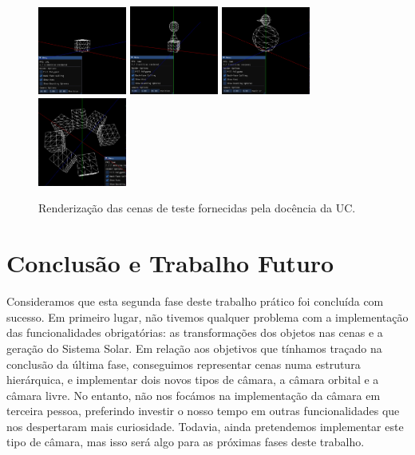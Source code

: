 \documentclass[12pt, a4paper]{article}
\begin{document}
\begin{figure}[H]
    \begin{adjustwidth}{-2cm}{-2cm}
        \centering
        \includegraphics[width=0.26\textwidth]{res/phase2/results/Test1.png}
        \includegraphics[width=0.26\textwidth]{res/phase2/results/Test2.png}
        \includegraphics[width=0.26\textwidth]{res/phase2/results/Test3.png}
        \includegraphics[width=0.26\textwidth]{res/phase2/results/Test4.png}
        \caption{Renderização das cenas de teste fornecidas pela docência da UC.}
    \end{adjustwidth}
\end{figure}

\section{Conclusão e Trabalho Futuro}

Consideramos que esta segunda fase deste trabalho prático foi concluída com sucesso. Em primeiro
lugar, não tivemos qualquer problema com a implementação das funcionalidades obrigatórias: as
transformações dos objetos nas cenas e a geração do Sistema Solar. Em relação aos objetivos que
tínhamos traçado na conclusão da última fase, conseguimos representar cenas numa estrutura
hierárquica, e implementar dois novos tipos de câmara, a câmara orbital e a câmara livre. No
entanto, não nos focámos na implementação da câmara em terceira pessoa, preferindo investir o nosso
tempo em outras funcionalidades que nos despertaram mais curiosidade. Todavia, ainda pretendemos
implementar este tipo de câmara, mas isso será algo para as próximas fases deste trabalho.
\end{document}
